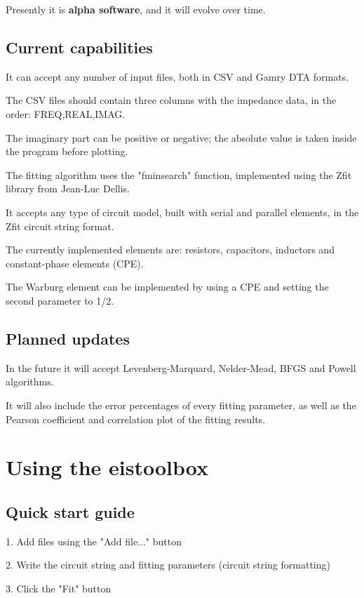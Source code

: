 \documentclass[10pt,a4paper]{memoir}
\begin{document}
Presently it is \textbf{alpha software}, and it will evolve over time.

\section{Current capabilities}

It can accept any number of input files, both in CSV and Gamry DTA formats.

The CSV files should contain three columns with the impedance data, in the order: FREQ,REAL,IMAG. 

The imaginary part can be positive or negative; the absolute value is taken inside the program before plotting.

The fitting algorithm uses the "fminsearch" function, implemented using the Zfit library from Jean-Luc Dellis. 

It accepts any type of circuit model, built with serial and parallel elements, in the Zfit circuit string format.

The currently implemented elements are: resistors, capacitors, inductors and constant-phase elements (CPE). 

The Warburg element can be implemented by using a CPE and setting the second parameter to 1/2.


\section{Planned updates}

In the future it will accept Levenberg-Marquard, Nelder-Mead, BFGS and Powell algorithms.

It will also include the error percentages of every fitting parameter, as well as the Pearson coefficient and correlation plot of the fitting results.


\chapter{Using the eistoolbox}

\section{Quick start guide}

1. Add files using the "Add file..." button

2. Write the circuit string and fitting parameters (circuit string formatting)

3. Click the "Fit" button
\end{document}
